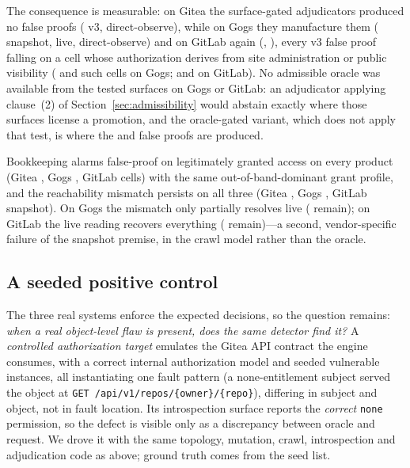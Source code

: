 The consequence is measurable: on Gitea the surface-gated adjudicators produced no false
proofs (\GtFpVthree{} v3, \GtFpDirectObserve{} direct-observe), while on Gogs they manufacture
them (\GgFpVthree{} snapshot, \GgFpVthreeLive{} live, \GgFpDirectObserve{} direct-observe) and
on GitLab again (\GlFpVthree{}, \GlFpDirectObserve{}), every v3 false proof falling on a cell
whose authorization derives from site administration or public visibility
(\GgImplicitSiteAdmin{} and \GgImplicitPublic{} such cells on Gogs; \GlImplicitSiteAdmin{} and
\GlImplicitPublic{} on GitLab). No admissible oracle was available from the tested surfaces on
Gogs or GitLab: an adjudicator applying clause~(2) of
Section~\ref{sec:admissibility} would abstain exactly where those surfaces license a
promotion, and the oracle-gated variant, which does not apply that test, is where the
\GgFpVthree{} and \GlFpVthree{} false proofs are produced.

Bookkeeping alarms false-proof on legitimately granted access on every product (Gitea
\GtFpBookkeeping{}, Gogs \GgFpBookkeeping{}, GitLab \GlFpBookkeeping{} cells) with the same
out-of-band-dominant grant profile, and the reachability mismatch persists on all three (Gitea
\GtMismatchSnap{}, Gogs \GgMismatchSnap{}, GitLab \GlMismatchSnap{} snapshot). On Gogs the
mismatch only partially resolves live (\GgMismatchLive{} remain); on GitLab the live reading
recovers everything (\GlMismatchLive{} remain)---a second, vendor-specific failure of the
snapshot premise, in the crawl model rather than the oracle.

\subsection{A seeded positive control}
\label{sec:seeded}

The three real systems enforce the expected decisions, so the question remains: \emph{when a
real object-level flaw is present, does the same detector find it?} A \emph{controlled
authorization target} emulates the Gitea API contract the engine consumes, with a correct
internal authorization model and \SeedBolaN{} seeded vulnerable instances, all instantiating
one fault pattern (a none-entitlement subject served the object at
\texttt{GET /api/v1/repos/\{owner\}/\{repo\}}), differing in subject and object, not in fault
location. Its introspection surface reports the \emph{correct} \texttt{none} permission, so
the defect is visible only as a discrepancy between oracle and request. We drove it with the
same topology, mutation, crawl, introspection and adjudication code as above; ground truth
comes from the seed list.

